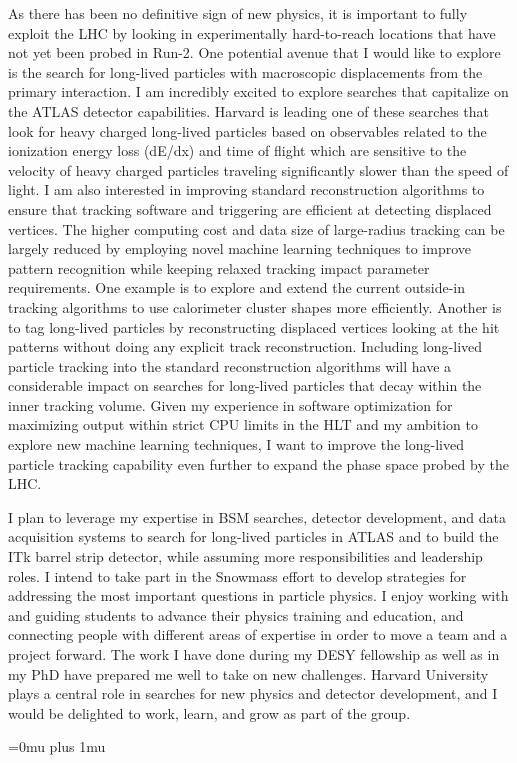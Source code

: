 \documentclass[a4paper]{article}
\begin{document}
As there has been no definitive sign of new physics, it is important to fully exploit the LHC by looking in experimentally hard-to-reach locations that have not yet been probed in Run-2. One potential avenue that I would like to explore is the search for long-lived particles with macroscopic displacements from the primary interaction\cite{alimena2019searching}. I am incredibly excited to explore searches that capitalize on the ATLAS detector capabilities. Harvard is leading one of these searches that look for heavy charged long-lived particles based on observables related to the ionization energy loss (dE/dx) and time of flight which are sensitive to the velocity of heavy charged particles traveling significantly slower than the speed of light. I am also interested in improving standard reconstruction algorithms to ensure that tracking software and triggering are efficient at detecting displaced vertices. The higher computing cost and data size of large-radius tracking can be largely reduced by employing novel machine learning techniques to improve pattern recognition while keeping relaxed tracking impact parameter requirements. One example is to explore and extend the current outside-in tracking algorithms to use calorimeter cluster shapes more efficiently. Another is to tag long-lived particles by reconstructing displaced vertices looking at the hit patterns without doing any explicit track reconstruction. Including long-lived particle tracking into the standard reconstruction algorithms will have a considerable impact on searches for long-lived particles that decay within the inner tracking volume. Given my experience in software optimization for maximizing output within strict CPU limits in the HLT and my ambition to explore new machine learning techniques, I want to improve the long-lived particle tracking capability even further to expand the phase space probed by the LHC.



\bigskip

I plan to leverage my expertise in BSM searches, detector development, and data acquisition systems to search for long-lived particles in ATLAS and to build the ITk barrel strip detector, while assuming more responsibilities and leadership roles. I intend to take part in the Snowmass effort to develop strategies for addressing the most important questions in particle physics. I enjoy working with and guiding students to advance their physics training and education, and connecting people with different areas of expertise in order to move a team and a project forward. The work I have done during my DESY fellowship as well as in my PhD have prepared me well to take on new challenges. Harvard University plays a central role in searches for new physics and detector development, and I would be delighted to work, learn, and grow as part of the group.

\bigskip\bigskip\bigskip

\Urlmuskip=0mu plus 1mu\relax
{%
\fontsize{11}{14}
\selectfont
}{}

\end{document}
